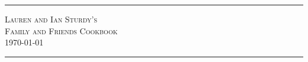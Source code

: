 \begin{titlepage}
\begin{center}
\hrule
\vspace{2cm}
\textsc{\Huge Lauren and Ian Sturdy's \\ Family and Friends Cookbook}\\[3cm]
\setlength\fboxsep{0pt}
\setlength\fboxrule{5pt}
{\Huge \today}
\\[2cm]
\hrule

\end{center}
\end{titlepage}